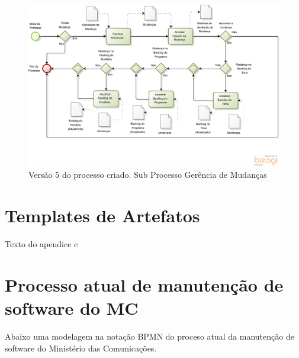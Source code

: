 \begin{apendicesenv}
\begin{figure}[H]
    \centering
	\includegraphics[keepaspectratio=true,scale=0.53]{figuras/evolucao_processo/Processo_v5_3.eps}
    \caption{Versão 5 do processo criado. Sub Processo Gerência de Mudanças }
    \label{fig:processo}
\end{figure}

\chapter{Templates de Artefatos}\label{apendice:templates}

Texto do apendice c

\chapter{Processo atual de manutenção de software do MC}\label{apendice:current_process_mc}

  Abaixo uma modelagem na notação BPMN do proceso atual da manutenção de software do Ministério das Comunicações.


\end{apendicesenv}
